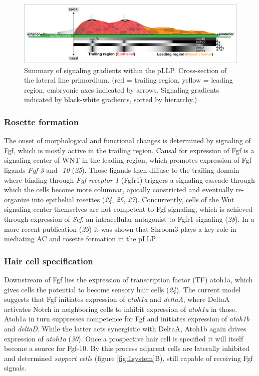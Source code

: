 \documentclass[11pt,singlespacinge,twoside]{reedthesis} %
\begin{document}
\begin{figure}

{\centering \includegraphics[width=.75\textwidth]{figures/intro/pllp} 

}

\caption[Summary of signaling gradients within the pLLP]{Summary of signaling gradients within the pLLP. Cross-section of the lateral line primordium. (red = trailing region, yellow = leading region; embryonic axes indicated by arrows. Signaling gradients indicated by black-white gradients, sorted by hierarchy.)}\label{fig:pllp}
\end{figure}
\hypertarget{rosette-formation}{%
\subsubsection{Rosette formation}\label{rosette-formation}}

The onset of morphological and functional changes is determined by signaling of Fgf, which is mostly active in the trailing region. Causal for expression of Fgf is a signaling center of WNT in the leading region, which promotes expression of Fgf ligands \emph{Fgf-3} and \emph{-10} (\emph{25}). Those ligands then diffuse to the trailing domain where binding through \emph{Fgf receptor 1} (Fgfr1) triggers a signaling cascade through which the cells become more columnar, apically constricted and eventually re-organize into epithelial rosettes (\emph{24}, \emph{26}, \emph{27}). Concurrently, cells of the Wnt signaling center themselves are not competent to Fgf signaling, which is achieved through expression of \emph{Sef}, an intracellular antagonist to Fgfr1 signaling (\emph{28}). In a more recent publication (\emph{29}) it was shown that Shroom3 plays a key role in mediating AC and rosette formation in the pLLP.

\hypertarget{hair-cell-specification}{%
\subsubsection{Hair cell specification}\label{hair-cell-specification}}

Downstream of Fgf lies the expression of transcription factor (TF) atoh1a, which gives cells the potential to become sensory hair cells (\emph{24}). The current model suggests that Fgf initiates expression of \emph{atoh1a} and \emph{deltaA}, where DeltaA activates Notch in neighboring cells to inhibit expression of \emph{atoh1a} in those. Atoh1a in turn suppresses competence for Fgf and initiates expression of \emph{atoh1b} and \emph{deltaD}. While the latter acts synergistic with DeltaA, Atoh1b again drives expression of \emph{atoh1a} (\emph{30}). Once a prospective hair cell is specified it will itself become a source for Fgf-10. By this process adjacent cells are laterally inhibited and determined \emph{support cells} (figure \ref{fig:llsystem}B), still capable of receiving Fgf signals.
\end{document}
